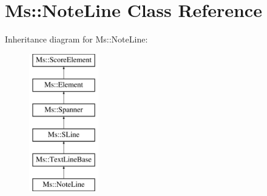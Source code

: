 \hypertarget{class_ms_1_1_note_line}{}\section{Ms\+:\+:Note\+Line Class Reference}
\label{class_ms_1_1_note_line}
Inheritance diagram for Ms\+:\+:Note\+Line\+:\begin{figure}[H]
\begin{center}
\leavevmode
\includegraphics[height=6.000000cm]{class_ms_1_1_note_line}
\end{center}
\end{figure}
